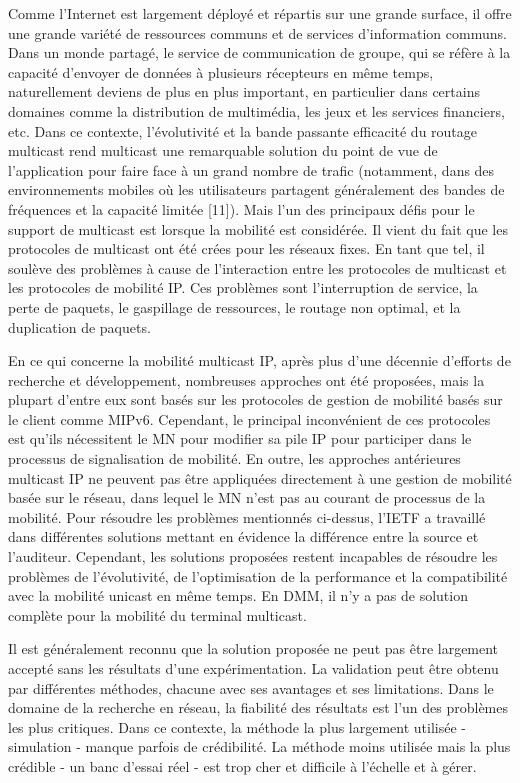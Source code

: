 Comme l'Internet est largement déployé et répartis sur une grande surface, il offre une grande variété de ressources communs et de services d'information communs. Dans un monde partagé, le service de communication de groupe, qui se réfère à la capacité d'envoyer de données à plusieurs récepteurs en même temps, naturellement deviens de plus en plus important, en particulier dans certains domaines comme la distribution de multimédia, les jeux et les services financiers, etc. Dans ce contexte, l'évolutivité et la bande passante efficacité du routage multicast rend multicast une remarquable solution du point de vue de l'application pour faire face à un grand nombre de trafic (notamment, dans des environnements mobiles où les utilisateurs partagent généralement des bandes de fréquences et la capacité limitée [11]). Mais l'un des principaux défis pour le support de multicast est lorsque la mobilité est considérée. Il vient du fait que les protocoles de multicast ont été crées pour les réseaux fixes. En tant que tel, il soulève des problèmes à cause de l'interaction entre les protocoles de multicast et les protocoles de mobilité IP. Ces problèmes sont l'interruption de service, la perte de paquets, le gaspillage de ressources, le routage non optimal, et la duplication de paquets.


En ce qui concerne la mobilité multicast IP, après plus d'une décennie d'efforts de recherche et développement, nombreuses approches ont été proposées, mais la plupart d'entre eux sont basés sur les protocoles de gestion de mobilité basés sur le client comme MIPv6. Cependant, le principal inconvénient de ces protocoles est qu'ils nécessitent le MN pour modifier sa pile IP pour participer dans le processus de signalisation de mobilité. En outre, les approches antérieures multicast IP ne peuvent pas être appliquées directement à une gestion de mobilité basée sur le réseau, dans lequel le MN n'est pas au courant de processus de la mobilité. Pour résoudre les problèmes mentionnés ci-dessus, l'IETF a travaillé dans différentes solutions mettant en évidence la différence entre la source et l'auditeur. Cependant, les solutions proposées restent incapables de résoudre les problèmes de l'évolutivité, de l'optimisation de la performance et la compatibilité avec la mobilité unicast en même temps. En DMM, il n'y a pas de solution complète pour la mobilité du terminal multicast.

Il est généralement reconnu que la solution proposée ne peut pas être largement accepté sans les résultats d'une expérimentation. La validation peut être obtenu par différentes méthodes, chacune avec ses avantages et ses limitations. Dans le domaine de la recherche en réseau, la fiabilité des résultats est l'un des problèmes les plus critiques. Dans ce contexte, la méthode la plus largement utilisée - simulation - manque parfois de crédibilité. La méthode moins utilisée mais la plus crédible - un banc d'essai réel - est trop cher et difficile à l'échelle et à gérer.


